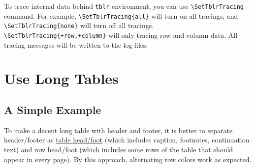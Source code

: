 \documentclass[oneside]{book}
\begin{document}
To trace internal data behind \verb!tblr! environment, you can use \verb!\SetTblrTracing! command.
For example, \verb!\SetTblrTracing{all}! will turn on all tracings,
and \verb!\SetTblrTracing{none}! will turn off all tracings.
\verb!\SetTblrTracing{+row,+column}! will only tracing row and column data.
All tracing messages will be written to the log files.

\chapter{Use Long Tables}
\label{chap:long}

\section{A Simple Example}

To make a decent long table with header and footer, it is better to separate header/footer as
\underline{table head/foot} (which includes caption, footnotes, continuation text)
and \underline{row head/foot} (which includes some rows of the table that should appear in every page).
By this approach, alternating row colors work as expected.
\end{document}
